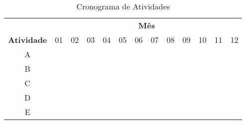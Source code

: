 \documentclass[12pt]{article}
\begin{document}
\begin{table}[ht]
\centering
\caption{Cronograma de Atividades}
\label{crono}
\begin{tabular}{|c|l|l|l|l|l|l|l|l|l|l|l|l|}
\hline
 & \multicolumn{12}{c|}{\textbf{Mês}} \\ \cline{2-13} 
\multirow{-2}{*}{\textbf{Atividade}} & 01 & 02 & 03 & 04 & 05 & 06 & 07 & 08 & 09 & 10 & 11 & 12 \\ \hline
A & \cellcolor[HTML]{9B9B9B} & \cellcolor[HTML]{9B9B9B} & \cellcolor[HTML]{9B9B9B} &  &  &  &  &  &  &  &  &  \\ \hline
B &  &  & \cellcolor[HTML]{9B9B9B} & \cellcolor[HTML]{9B9B9B} & \cellcolor[HTML]{9B9B9B} & \cellcolor[HTML]{9B9B9B} &  &  &  &  &  &  \\ \hline
C &  &  &  &  & \cellcolor[HTML]{9B9B9B} & \cellcolor[HTML]{9B9B9B} & \cellcolor[HTML]{9B9B9B} & \cellcolor[HTML]{9B9B9B} &  &  &  &  \\ \hline
D &  &  &  &  &  &  & \cellcolor[HTML]{9B9B9B} & \cellcolor[HTML]{9B9B9B} & \cellcolor[HTML]{9B9B9B} & \cellcolor[HTML]{9B9B9B} &  &  \\ \hline
E &  &  &  &  &  &  &  &  & \cellcolor[HTML]{9B9B9B} & \cellcolor[HTML]{9B9B9B} & \cellcolor[HTML]{9B9B9B} & \cellcolor[HTML]{9B9B9B} \\ \hline
\end{tabular}
\end{table}


% 
% 
% 
% 



\end{document}
